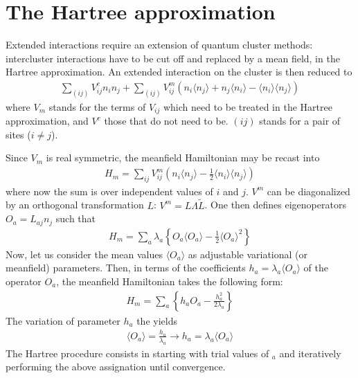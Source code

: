 \documentclass[letterpaper,10pt,english]{sphinxmanual}
\begin{document}
\section{The Hartree approximation}
\label{\detokenize{utilities:the-hartree-approximation}}
\sphinxAtStartPar
Extended interactions require an extension of quantum cluster methods: inter\sphinxhyphen{}cluster interactions have to be cut off and replaced by a mean field, in the Hartree approximation.
An extended interaction on the cluster is then reduced to
\begin{equation*}
\begin{split}\sum_{(ij)}V^c_{ij}n_i n_j +
\sum_{(ij)}V^m_{ij}\left(n_i \langle n_j\rangle + n_j \langle n_i\rangle - \langle n_i\rangle\langle n_j\rangle \right)\end{split}
\end{equation*}
\sphinxAtStartPar
where \(V_m\) stands for the terms of \(V_{ij}\) which need to be treated in the Hartree approximation, and \(V^c\) those that do not need to be. \((ij)\) stands for a pair of sites (\(i\ne j\)).

\sphinxAtStartPar
Since \(V_m\) is real symmetric, the mean\sphinxhyphen{}field Hamiltonian may be recast into
\begin{equation*}
\begin{split}H_m = \sum_{ij}V^m_{ij}\left(n_i \langle n_j\rangle - \frac12\langle n_i\rangle\langle n_j\rangle \right)\end{split}
\end{equation*}
\sphinxAtStartPar
where now the sum is over independent values of \(i\) and \(j\).
\(V^m\) can be diagonalized by an orthogonal transformation \(L\): \(V^m = L\Lambda \tilde L\).
One then defines eigenoperators \(O_a = L_{aj}n_j\) such that
\begin{equation*}
\begin{split}H_m = \sum_a \lambda_a\left\{O_a \langle O_a\rangle - \frac12 \langle O_a\rangle^2\right\}\end{split}
\end{equation*}
\sphinxAtStartPar
Now, let us consider the mean values \(\langle O_a\rangle\) as adjustable variational (or mean\sphinxhyphen{}field) parameters.
Then, in terms of the coefficients \(h_a=\lambda_a\langle O_a\rangle\) of the operator \(O_a\), the mean\sphinxhyphen{}field Hamiltonian takes the following form:
\begin{equation*}
\begin{split}H_m = \sum_a \left\{ h_a O_a - \frac{h_a^2}{2\lambda_a} \right\}\end{split}
\end{equation*}
\sphinxAtStartPar
The variation of parameter \(h_a\) the yields
\begin{equation*}
\begin{split}\langle O_a\rangle = \frac{h_a}{\lambda_a} \rightarrow h_a=\lambda_a\langle O_a\rangle\end{split}
\end{equation*}
\sphinxAtStartPar
The Hartree procedure consists in starting with trial values of \(_a\) and iteratively performing the above assignation until convergence.
\end{document}
